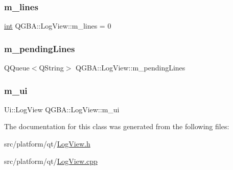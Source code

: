 \subsubsection{\texorpdfstring{m\+\_\+lines}{m\_lines}}
{\footnotesize\ttfamily \mbox{\hyperlink{ioapi_8h_a787fa3cf048117ba7123753c1e74fcd6}{int}} Q\+G\+B\+A\+::\+Log\+View\+::m\+\_\+lines = 0\hspace{0.3cm}{\ttfamily [private]}}

\mbox{\label{class_q_g_b_a_1_1_log_view_a77842da472ca74e8b5b54ea865beaf17}} 
\subsubsection{\texorpdfstring{m\+\_\+pending\+Lines}{m\_pendingLines}}
{\footnotesize\ttfamily Q\+Queue$<$Q\+String$>$ Q\+G\+B\+A\+::\+Log\+View\+::m\+\_\+pending\+Lines\hspace{0.3cm}{\ttfamily [private]}}

\mbox{\label{class_q_g_b_a_1_1_log_view_ad14d2319c553761effb0dcfa47ead0b3}} 
\subsubsection{\texorpdfstring{m\+\_\+ui}{m\_ui}}
{\footnotesize\ttfamily Ui\+::\+Log\+View Q\+G\+B\+A\+::\+Log\+View\+::m\+\_\+ui\hspace{0.3cm}{\ttfamily [private]}}



The documentation for this class was generated from the following files\+:\begin{DoxyCompactItemize}
\item 
src/platform/qt/\mbox{\hyperlink{_log_view_8h}{Log\+View.\+h}}\item 
src/platform/qt/\mbox{\hyperlink{_log_view_8cpp}{Log\+View.\+cpp}}\end{DoxyCompactItemize}
